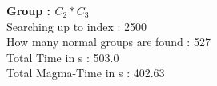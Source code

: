 \textbf{Group : $C_2*C_3$}\\
Searching up to index : 2500\\
How many normal groups are found : 527\\
Total Time in s : 503.0\\
Total Magma-Time in s : 402.63\\
